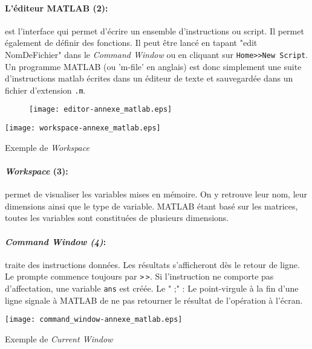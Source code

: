 \paragraph{L'éditeur MATLAB (2): } est l'interface qui permet d'écrire
un ensemble d'instructions ou script. Il permet également de définir 
des fonctions. Il peut être lancé en tapant "edit NomDeFichier" dans le 
\emph{Command Window} ou en cliquant sur \verb?Home>>New Script?.
Un programme MATLAB (ou 'm-file' en anglais) est donc simplement
une suite d'instructions matlab écrites dans un éditeur de texte et 
sauvegardée dans un fichier d'extension \texttt{.m}.
\begin{figure}[!h]
    \centering
    \texttt{[image: editor-annexe\_matlab.eps]}
\end{figure}
\begin{marginfigure}
    \centering
    \texttt{[image: workspace-annexe\_matlab.eps]}
    \caption{Exemple de \emph{Workspace}\label{fig-Workspace}}    
\end{marginfigure}
\paragraph*{\emph{Workspace} (3): } permet de visualiser les variables mises 
en mémoire. On y retrouve leur nom, leur dimensions ainsi que le type 
de variable. MATLAB étant basé sur les matrices, toutes les
variables sont constituées de plusieurs dimensions.

\paragraph*{\emph{Command Window (4)}: } traite des instructions
données. Les résultats s'afficheront dès le retour de ligne. Le prompte 
commence toujours par \texttt{>}\,\texttt{>}. Si l'instruction ne 
comporte pas d'affectation, une variable \texttt{ans} est créée.
Le " ;" : Le point-virgule à la fin d'une ligne signale à MATLAB de ne pas
retourner le résultat de l'opération à l'écran.
\begin{marginfigure}
    \centering
    \texttt{[image: command\_window-annexe\_matlab.eps]}
    \caption{Exemple de \emph{Current Window}\label{fig-CW}}    
\end{marginfigure}
\clearpage
\restoregeometry
\captionsetup{width=0.9\linewidth}

